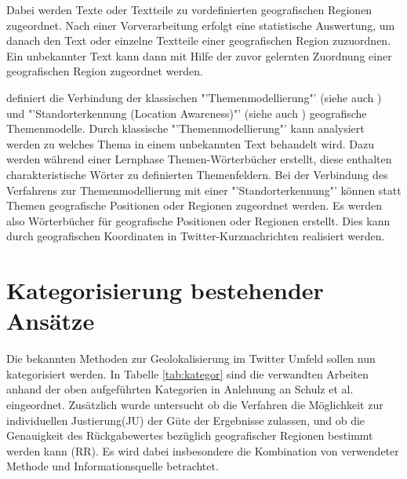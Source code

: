 			Dabei werden Texte oder Textteile zu vordefinierten geografischen Regionen zugeordnet. 
			Nach einer Vorverarbeitung erfolgt eine statistische Auswertung, um danach den Text oder einzelne Textteile einer geografischen Region zuzuordnen. 
			Ein unbekannter Text kann dann mit Hilfe der zuvor gelernten Zuordnung einer geografischen Region zugeordnet werden.
			
			\cite{Priedhorsky2013} definiert die Verbindung der klassischen "'Themenmodellierung"' (siehe auch \cite{Blei2012}) und "'Standorterkennung (Location Awareness)"' (siehe auch \cite{Wang2007}) geografische Themenmodelle. 
			Durch klassische "'Themenmodellierung"' kann analysiert werden zu welches Thema in einem unbekannten Text behandelt wird. 
			Dazu werden während einer Lernphase Themen-Wörterbücher erstellt, diese enthalten charakteristische Wörter zu definierten Themenfeldern. \cite{Blei2012} 
			Bei der Verbindung des Verfahrens zur Themenmodellierung mit einer "'Standorterkennung"' können statt Themen geografische Positionen oder Regionen zugeordnet werden.
			Es werden also Wörterbücher für geografische Positionen oder Regionen erstellt. 
			Dies kann durch geografischen Koordinaten in Twitter-Kurznachrichten realisiert werden. 
		

	\section{Kategorisierung bestehender Ansätze} 

		Die bekannten Methoden zur Geolokalisierung im Twitter Umfeld sollen nun kategorisiert werden. 
		In Tabelle \ref{tab:kategor} sind die verwandten Arbeiten anhand der oben aufgeführten Kategorien in Anlehnung an Schulz et al. \cite{Schulz2013} eingeordnet.
		Zusätzlich wurde untersucht ob die Verfahren die Möglichkeit zur individuellen Justierung(JU) der Güte der Ergebnisse zulassen, und ob die Genauigkeit des Rückgabewertes bezüglich geografischer Regionen bestimmt werden kann (RR).
		Es wird dabei insbesondere die Kombination von verwendeter Methode und Informationsquelle betrachtet.
		

